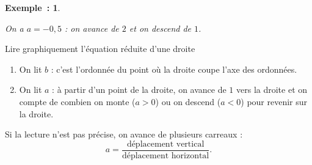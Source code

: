 \documentclass[12pt]{article}
\theoremstyle{break}
\newtheorem*{example}{Exemple~:}
\theoremstyle{inline}
\begin{document}
\begin{example}
\begin{minipage}[t]{0.55\linewidth}
\begin{multihideW}[2em]
      \medskip
      On a $a = -0{,}5$ : on avance de $2$ et on descend de $1$.
    \end{multihideW}
  \end{minipage}
  \hfill
  \begin{minipage}[t]{0.5\linewidth}
    \vspace{0pt}
    \centering
  \end{minipage}
\end{example}

\begin{method}{Lire graphiquement l'équation réduite d'une droite}{}
  \begin{enumerate}
    \item On lit $b$ : c'est l'ordonnée du point où la droite coupe l'axe des ordonnées.
    \item On lit $a$ : à partir d'un point de la droite, on avance de $1$ vers la droite et on compte de combien on monte ($a > 0$) ou on descend ($a < 0$) pour revenir sur la droite.
  \end{enumerate}
  Si la lecture n'est pas précise, on avance de plusieurs carreaux :
  \[
    a = \frac{\text{déplacement vertical}}{\text{déplacement horizontal}}.
  \]
\end{method}
\end{document}

